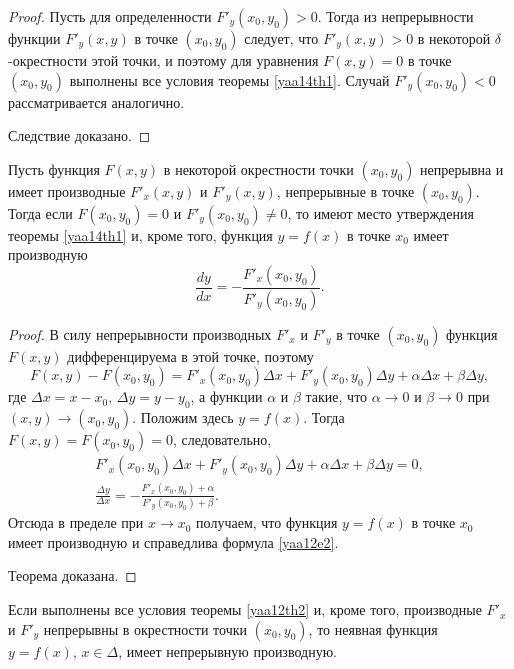\begin{proof}
Пусть для определенности $F'_y(x_0,y_0)>0$. Тогда из непрерывности функции $F'_y(x,y)$ в точке $(x_0,y_0)$ следует, что $F'_y(x,y)>0$ в некоторой $\delta$-окрестности этой точки, и поэтому для уравнения $F(x,y)=0$ в точке $(x_0,y_0)$ выполнены все условия теоремы \ref{yaa14th1}. Случай $F'_y(x_0,y_0)<0$ рассматривается аналогично.

Следствие доказано.
\end{proof}

\begin{thm} \label{yaa12th2}
Пусть функция $F(x,y)$ в некоторой окрестности точки $(x_0,y_0)$ непрерывна и имеет производные $F'_x(x,y)$ и $F'_y(x,y)$, непрерывные в точке $(x_0,y_0)$. Тогда если $F(x_0,y_0)=0$ и $F'_y(x_0,y_0)\ne 0$, то имеют место утверждения теоремы \ref{yaa14th1} и, кроме того, функция $y=f(x)$ в точке $x_0$ имеет производную
\begin{equation}\label{yaa12e2}
\frac{dy}{dx} = -\frac{F'_x(x_0,y_0)}{F'_y(x_0,y_0)}.
\end{equation}
\end{thm}

\begin{proof}
В силу непрерывности производных $F'_x$ и $F'_y$ в точке $(x_0,y_0)$ функция $F(x,y)$ дифференцируема в этой точке, поэтому
$$
F(x,y)-F(x_0,y_0)=F'_x(x_0,y_0)\Delta x+F'_y(x_0,y_0)\Delta y+\alpha\Delta x+\beta\Delta y,
$$
где $\Delta x=x-x_0,\, \Delta y = y-y_0$, а функции $\alpha$ и $\beta$ такие, что $\alpha\to 0$ и $\beta \to 0$ при $(x,y)\to (x_0,y_0)$. Положим здесь $y=f(x)$. Тогда $F(x,y) = F(x_0,y_0)=0$, следовательно,
\begin{gather*}
F'_x(x_0,y_0)\Delta x+F'_y(x_0,y_0)\Delta y + \alpha\Delta x+\beta\Delta y=0,\\
\frac{\Delta y}{\Delta x} = -\frac{F'_x(x_0,y_0)+\alpha}{F'_y(x_0,y_0)+\beta}.
\end{gather*}
Отсюда в пределе при $x \to x_0$ получаем, что функция $y=f(x)$ в точке $x_0$ имеет производную и справедлива формула \eqref{yaa12e2}.

Теорема доказана.
\end{proof}

\begin{cons}\label{yaa12c2}
Если выполнены все условия теоремы \ref{yaa12th2} и, кроме того, производные $F'_x$ и $F'_y$ непрерывны в окрестности точки $(x_0,y_0)$, то неявная функция $y=f(x),\,x\in\Delta$, имеет непрерывную производную.
\end{cons}

